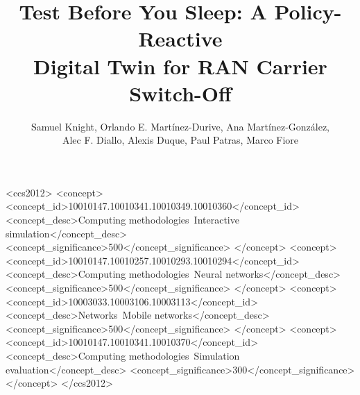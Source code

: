 \documentclass[sigconf, 10pt]{acmart}
\begin{document}
\begin{CCSXML}
<ccs2012>
<concept>
<concept_id>10010147.10010341.10010349.10010360</concept_id>
<concept_desc>Computing methodologies~Interactive simulation</concept_desc>
<concept_significance>500</concept_significance>
</concept>
<concept>
<concept_id>10010147.10010257.10010293.10010294</concept_id>
<concept_desc>Computing methodologies~Neural networks</concept_desc>
<concept_significance>500</concept_significance>
</concept>
<concept>
<concept_id>10003033.10003106.10003113</concept_id>
<concept_desc>Networks~Mobile networks</concept_desc>
<concept_significance>500</concept_significance>
</concept>
<concept>
<concept_id>10010147.10010341.10010370</concept_id>
<concept_desc>Computing methodologies~Simulation evaluation</concept_desc>
<concept_significance>300</concept_significance>
</concept>
</ccs2012>
\end{CCSXML}



\title[Test Before You Sleep: A Policy-Reactive Digital Twin for RAN Carrier Switch-Off]{Test Before You Sleep: A Policy-Reactive\\Digital Twin for RAN Carrier Switch-Off}


\author[S. Knight et al.]{Samuel Knight, Orlando E. Martínez-Durive, Ana Martínez-González,\\
Alec F. Diallo, Alexis Duque, Paul Patras, Marco Fiore}



\end{document}
